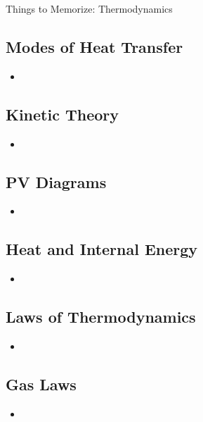 \documentclass[letterpaper, 12pt]{article}
\begin{document}
	


\begin{center}Things to Memorize: Thermodynamics
\end{center}

\subsection*{Modes of Heat Transfer}
\begin{itemize}
	\item 
\end{itemize}

\subsection*{Kinetic Theory}
\begin{itemize}
	\item 
	
	
\end{itemize}

	
\subsection*{PV Diagrams}
\begin{itemize}
			\item 	
\end{itemize}

	
\subsection*{{Heat and Internal Energy}}

	\begin{itemize}
	\item 
	
\end{itemize}

\subsection*{Laws of Thermodynamics}
\begin{itemize}
	\item 
	
\end{itemize}



\subsection*{Gas Laws}
\begin{itemize}
	\item 
\end{itemize}
 
\end{document}
